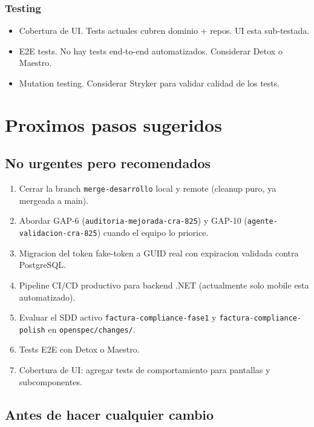 \documentclass[11pt,a4paper,oneside]{report}
\begin{document}
\subsection*{Testing}
\begin{itemize}[leftmargin=*]
    \item Cobertura de UI. Tests actuales cubren dominio + repos. UI esta sub-testada.
    \item E2E tests. No hay tests end-to-end automatizados. Considerar Detox o Maestro.
    \item Mutation testing. Considerar Stryker para validar calidad de los tests.
\end{itemize}


\chapter{Proximos pasos sugeridos}

\section{No urgentes pero recomendados}

\begin{enumerate}[leftmargin=*]
    \item Cerrar la branch \texttt{merge-desarrollo} local y remote (cleanup puro, ya mergeada a main).
    \item Abordar GAP-6 (\texttt{auditoria-mejorada-cra-825}) y GAP-10 (\texttt{agente-validacion-cra-825}) cuando el equipo lo priorice.
    \item Migracion del token fake-token a GUID real con expiracion validada contra PostgreSQL.
    \item Pipeline CI/CD productivo para backend .NET (actualmente solo mobile esta automatizado).
    \item Evaluar el SDD activo \texttt{factura-compliance-fase1} y \texttt{factura-compliance-polish} en \texttt{openspec/changes/}.
    \item Tests E2E con Detox o Maestro.
    \item Cobertura de UI: agregar tests de comportamiento para pantallas y subcomponentes.
\end{enumerate}

\section{Antes de hacer cualquier cambio}
\end{document}
